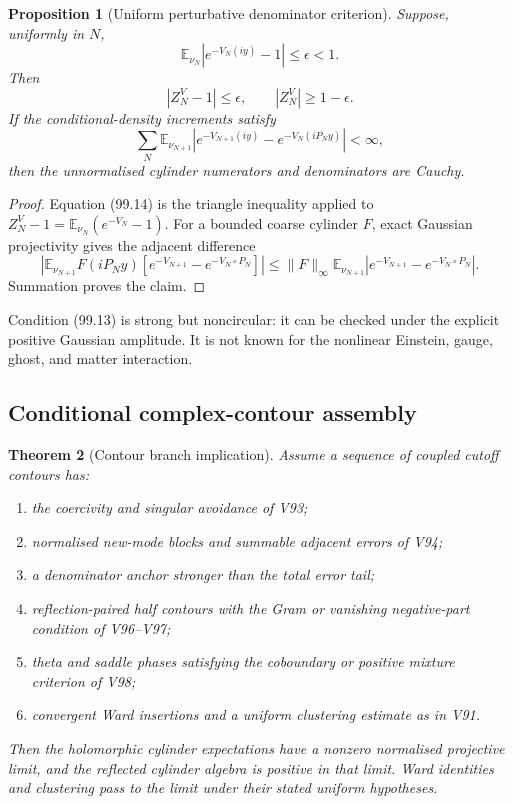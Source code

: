 \documentclass[11pt]{article}
\newtheorem{theorem}{Theorem}[section]
\newtheorem{proposition}[theorem]{Proposition}
\begin{document}
\begin{proposition}[Uniform perturbative denominator criterion]
\label{prop:v11v99-perturb}
Suppose, uniformly in \(N\),
\[
                    \mathbb E_{\nu_N}|e^{-V_N(iy)}-1|
                    \le\epsilon<1.                          \tag{99.13}
\]
Then
\[
                              |Z_N^V-1|\le\epsilon,\qquad
                              |Z_N^V|\ge1-\epsilon.           \tag{99.14}
\]
If the conditional-density increments satisfy
\[
 \sum_N\mathbb E_{\nu_{N+1}}
 \left|
 e^{-V_{N+1}(iy)}
 -e^{-V_N(iP_Ny)}
 \right|<\infty,                                            \tag{99.15}
\]
then the unnormalised cylinder numerators and denominators are
Cauchy.
\end{proposition}

\begin{proof}
Equation (99.14) is the triangle inequality applied to
\(Z_N^V-1=\mathbb E_{\nu_N}(e^{-V_N}-1)\).
For a bounded coarse cylinder \(F\), exact Gaussian projectivity gives
the adjacent difference
\[
 \left|
 \mathbb E_{\nu_{N+1}}
 F(iP_Ny)
 [e^{-V_{N+1}}-e^{-V_N\circ P_N}]
 \right|
 \le\|F\|_\infty
 \mathbb E_{\nu_{N+1}}
 |e^{-V_{N+1}}-e^{-V_N\circ P_N}|.
\]
Summation proves the claim.
\end{proof}

Condition (99.13) is strong but noncircular: it can be checked under
the explicit positive Gaussian amplitude.  It is not known for the
nonlinear Einstein, gauge, ghost, and matter interaction.

\subsection{Conditional complex-contour assembly}

\begin{theorem}[Contour branch implication]
\label{thm:v11v99-assembly}
Assume a sequence of coupled cutoff contours has:
\begin{enumerate}
\item the coercivity and singular avoidance of V93;
\item normalised new-mode blocks and summable adjacent errors of V94;
\item a denominator anchor stronger than the total error tail;
\item reflection-paired half contours with the Gram or vanishing
      negative-part condition of V96--V97;
\item theta and saddle phases satisfying the coboundary or positive
      mixture criterion of V98;
\item convergent Ward insertions and a uniform clustering estimate as
      in V91.
\end{enumerate}
Then the holomorphic cylinder expectations have a nonzero normalised
projective limit, and the reflected cylinder algebra is positive in
that limit.  Ward identities and clustering pass to the limit under
their stated uniform hypotheses.
\end{theorem}
\end{document}
